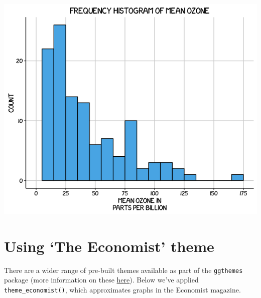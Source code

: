 \begin{center}\includegraphics[width=0.55\linewidth]{0_all_posts_pdf/histogram_14-1} \end{center}

\section{\texorpdfstring{Using `The Economist'
theme}{Using The Economist theme}}\label{using-the-economist-theme-6}

There are a wider range of pre-built themes available as part of the
\texttt{ggthemes} package (more information on these
\href{https://cran.r-project.org/web/packages/ggthemes/vignettes/ggthemes.html}{here}).
Below we've applied \texttt{theme\_economist()}, which approximates
graphs in the Economist magazine.

